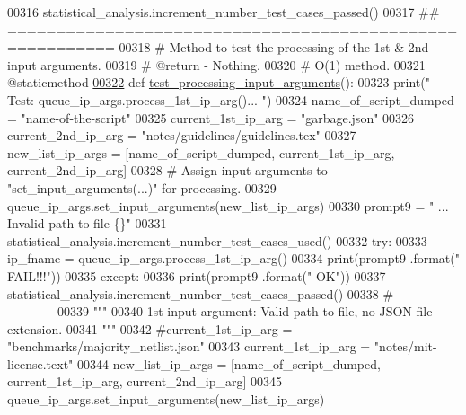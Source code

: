 \begin{DoxyCode}
00316             statistical\_analysis.increment\_number\_test\_cases\_passed()
00317     \textcolor{comment}{## =========================================================}
00318     \textcolor{comment}{#   Method to test the processing of the 1st & 2nd input arguments.}
00319     \textcolor{comment}{#   @return - Nothing.}
00320     \textcolor{comment}{#   O(1) method.}
00321     @staticmethod
\hypertarget{queue__ip__arguments__tester_8py_source_l00322}{}\hyperlink{classutilities_1_1queue__ip__arguments__tester_1_1queue__ip__args__tester_a53e53ec2797918a6488b0d75ba437407}{00322}     \textcolor{keyword}{def }\hyperlink{classutilities_1_1queue__ip__arguments__tester_1_1queue__ip__args__tester_a53e53ec2797918a6488b0d75ba437407}{test\_processing\_input\_arguments}():
00323         print(\textcolor{stringliteral}{" Test: queue\_ip\_args.process\_1st\_ip\_arg()... "})
00324         name\_of\_script\_dumped = \textcolor{stringliteral}{"name-of-the-script"}
00325         current\_1st\_ip\_arg = \textcolor{stringliteral}{"garbage.json"}
00326         current\_2nd\_ip\_arg = \textcolor{stringliteral}{"notes/guidelines/guidelines.tex"}
00327         new\_list\_ip\_args = [name\_of\_script\_dumped, current\_1st\_ip\_arg, current\_2nd\_ip\_arg]
00328         \textcolor{comment}{#   Assign input arguments to "set\_input\_arguments(...)" for processing.}
00329         queue\_ip\_args.set\_input\_arguments(new\_list\_ip\_args)
00330         prompt9 = \textcolor{stringliteral}{" ... Invalid path to file    \{\}"}
00331         statistical\_analysis.increment\_number\_test\_cases\_used()
00332         \textcolor{keywordflow}{try}:
00333             ip\_fname = queue\_ip\_args.process\_1st\_ip\_arg()
00334             print(prompt9 .format(\textcolor{stringliteral}{"     FAIL!!!"}))
00335         \textcolor{keywordflow}{except}:
00336             print(prompt9 .format(\textcolor{stringliteral}{"         OK"}))
00337             statistical\_analysis.increment\_number\_test\_cases\_passed()
00338         \textcolor{comment}{#   -   -   -   -   -   -   -   -   -   -   -   -   -}
00339         \textcolor{stringliteral}{"""}
00340 \textcolor{stringliteral}{            1st input argument: Valid path to file, no JSON file extension.}
00341 \textcolor{stringliteral}{        """}
00342         \textcolor{comment}{#current\_1st\_ip\_arg = "benchmarks/majority\_netlist.json"}
00343         current\_1st\_ip\_arg = \textcolor{stringliteral}{"notes/mit-license.text"}
00344         new\_list\_ip\_args = [name\_of\_script\_dumped, current\_1st\_ip\_arg, current\_2nd\_ip\_arg]
00345         queue\_ip\_args.set\_input\_arguments(new\_list\_ip\_args)

\end{DoxyCode}
